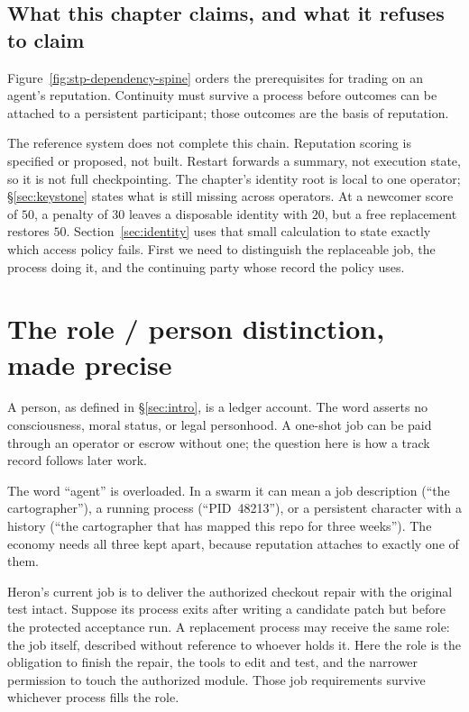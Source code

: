 \documentclass[11pt,a4paper]{article}
\theoremstyle{definition}
\begin{document}
\subsection{What this chapter claims, and what it refuses to claim}
Figure~\ref{fig:stp-dependency-spine} orders the prerequisites for trading on an
agent's reputation. Continuity must survive a process before outcomes can be
attached to a persistent participant; those outcomes are the basis of reputation.

\FloatBarrier
The reference system does not complete this chain. Reputation scoring is
specified or proposed, not built. Restart forwards a summary, not execution state, so it is
not full checkpointing. The chapter's identity root is local to one operator;
\S\ref{sec:keystone} states what is still missing across operators.
At a newcomer score of $50$, a penalty of $30$ leaves a disposable identity
with $20$, but a free replacement restores $50$. Section~\ref{sec:identity}
uses that small calculation to state exactly which access policy fails.
First we need to distinguish the replaceable job, the process doing it, and
the continuing party whose record the policy uses.

\pdexercisepointer{\ref{ex:stp-spawn-vs-person}}{\ref{ex:stp-operator-as-person}}{\pageref{ex:stp-spawn-vs-person}}

\section{The role / person distinction, made precise}\label{sec:role-person}

A person, as defined in \S\ref{sec:intro}, is a ledger account. The word
asserts no consciousness, moral status, or legal personhood. A one-shot job can
be paid through an operator or escrow without one; the question here is how a
track record follows later work.

The word ``agent'' is overloaded. In a swarm it can mean a job description
(``the cartographer''), a running process (``PID~48213''), or a persistent
character with a history (``the cartographer that has mapped this repo for three
weeks''). The economy needs all three kept apart, because reputation attaches to
exactly one of them.

Heron's current job is to deliver the authorized checkout repair with the
original test intact. Suppose its process exits after writing a candidate
patch but before the protected acceptance run. A replacement process may
receive the same role: the job itself, described without reference to
whoever holds it. Here the role is the obligation to finish the repair, the
tools to edit and test, and the narrower permission to touch the authorized
module. Those job requirements survive whichever process fills the role.
\end{document}
